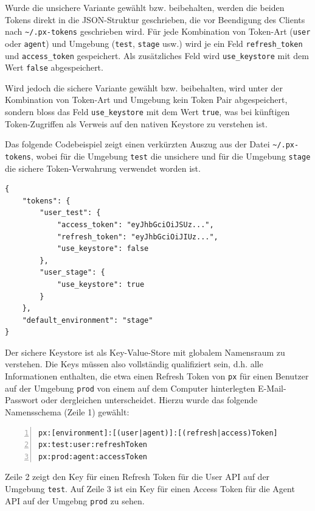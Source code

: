Wurde die unsichere Variante gewählt bzw. beibehalten, werden die beiden Tokens direkt in die JSON-Struktur geschrieben, die vor Beendigung des Clients nach \texttt{\~{}/.px-tokens} geschrieben wird. Für jede Kombination von Token-Art (\texttt{user} oder \texttt{agent}) und Umgebung (\texttt{test}, \texttt{stage} usw.) wird je ein Feld \texttt{refresh\_token} und \texttt{access\_token} gespeichert. Als zusätzliches Feld wird \texttt{use\_keystore} mit dem Wert \texttt{false} abgespeichert.

Wird jedoch die sichere Variante gewählt bzw. beibehalten, wird unter der Kombination von Token-Art und Umgebung kein Token Pair abgespeichert, sondern bloss das Feld \texttt{use\_keystore} mit dem Wert \texttt{true}, was bei künftigen Token-Zugriffen als Verweis auf den nativen Keystore zu verstehen ist.

Das folgende Codebeispiel zeigt einen verkürzten Auszug aus der Datei \texttt{\~{}/.px-tokens}, wobei für die Umgebung \texttt{test} die unsichere und für die Umgebung \texttt{stage} die sichere Token-Verwahrung verwendet worden ist.

\begin{lstlisting}[caption={Die JSON-Struktur für den Keystore (Auszug)}]
{
	"tokens": {
		"user_test": {
			"access_token": "eyJhbGciOiJSUz...",
			"refresh_token": "eyJhbGciOiJIUz...",
			"use_keystore": false
		},
		"user_stage": {
			"use_keystore": true
		}
	},
	"default_environment": "stage"
}
\end{lstlisting}

Der sichere Keystore ist als Key-Value-Store mit globalem Namensraum zu verstehen. Die Keys müssen also vollständig qualifiziert sein, d.h. alle Informationen enthalten, die etwa einen Refresh Token von \texttt{px} für einen Benutzer auf der Umgebung \texttt{prod} von einem auf dem Computer hinterlegten E-Mail-Passwort oder dergleichen unterscheidet. Hierzu wurde das folgende Namensschema (Zeile 1) gewählt:

\begin{lstlisting}[caption={Namensschema für die Keys auf dem nativen Keystore (mit Beispielen)},numbers=left]
px:[environment]:[(user|agent)]:[(refresh|access)Token]
px:test:user:refreshToken
px:prod:agent:accessToken
\end{lstlisting}

Zeile 2 zeigt den Key für einen Refresh Token für die User API auf der Umgebung \texttt{test}. Auf Zeile 3 ist ein Key für einen Access Token für die Agent API auf der Umgebng \texttt{prod} zu sehen.

